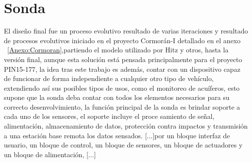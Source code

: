     
\section{Sonda}
El dise\~no final fue un proceso evolutivo resultado de varias iteraciones y resultado de procesos evolutivos iniciado en el proyecto Cormor\'an-I detallado en el anexo ~\ref{Anexo:Cormoran},partiendo el modelo utilizado por Hitz y otros\cite{hitz2012design},
hasta la versi\'on final, aunque esta soluci\'on est\'a pensada principalmente para el proyecto PIN15-177, la idea tras este trabajo es adem\'as, contar con un dispositivo capaz de funcionar de forma independiente a cualquier otro tipo de veh\'iculo, extendiendo as\'i sus posibles tipos de usos, como el monitoreo de acu\'iferos, esto supone que la sonda deba contar con todos los elementos necesarios para su correcto desenvolvimiento, la funci\'on principal de la sonda es brindar soporte a cada uno de los sensores, el soporte incluye el proce  samiento de se\~nal, alimentaci\'on, almacenamiento de datos, protecci\'on contra impactos y transmisi\'on a una estaci\'on base remota los datos sensados.
[...]por un bloque interfaz de usuario, un bloque de control, un bloque de sensores, un bloque de actuadores y un bloque de alimentaci\'on,  
[...]
